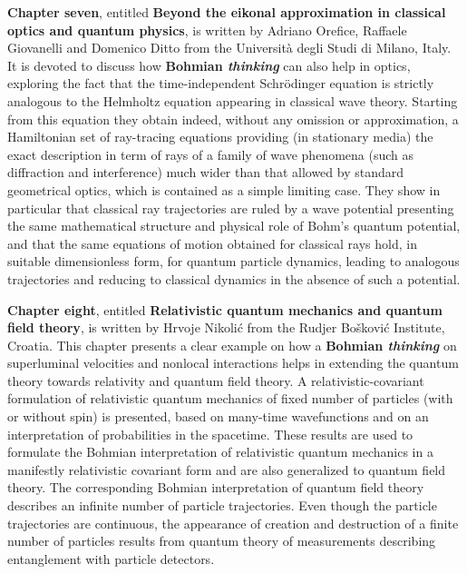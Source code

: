 \documentclass[nofootinbib, secnumarabic, amsmath, nobibnotes,10pt,aps,pra]{revtex4-1}
\begin{document}
\textbf{Chapter seven}, entitled \textbf{Beyond the eikonal approximation in classical optics and quantum physics}, is written by Adriano Orefice, Raffaele Giovanelli and Domenico Ditto from the Universit\`{a} degli Studi di Milano, Italy. It is devoted to discuss how \textbf{Bohmian \emph{thinking}} can also help in optics, exploring the fact that the time-independent Schr\"{o}dinger equation is strictly analogous to the Helmholtz equation appearing in classical wave theory. Starting from this equation they obtain indeed, without any omission or approximation, a Hamiltonian set of ray-tracing equations providing (in stationary media) the exact description in term of rays of a family of wave phenomena (such as diffraction and interference) much wider than that allowed by standard geometrical optics, which is contained as a simple limiting case. They show in particular that classical ray trajectories are ruled by a wave potential presenting the same mathematical structure and physical role of Bohm's quantum potential, and that the same equations of motion obtained for classical rays hold, in suitable dimensionless form, for quantum particle dynamics, leading to analogous trajectories and reducing to classical dynamics in the absence of such a potential.

\textbf{Chapter eight}, entitled \textbf{Relativistic quantum mechanics and quantum field theory}, is written by Hrvoje Nikoli\'c from the Rudjer Bo\v{s}kovi\'c Institute, Croatia. This chapter presents a clear example on how a \textbf{Bohmian \emph{thinking}} on superluminal velocities and nonlocal interactions helps in extending the quantum theory towards relativity and quantum field theory. A relativistic-covariant formulation of relativistic quantum mechanics of fixed number of particles (with or without spin) is presented, based on many-time wavefunctions and on an interpretation of probabilities in the spacetime. These results are used to formulate the Bohmian interpretation of relativistic quantum mechanics in a manifestly relativistic covariant form and are also generalized to quantum field theory. The corresponding Bohmian interpretation of quantum field theory describes an infinite number of particle trajectories. Even though the particle trajectories are continuous, the appearance of creation and destruction of a finite number of particles results from quantum theory of measurements describing entanglement with particle detectors.
\end{document}
